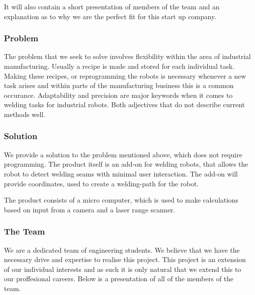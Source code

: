 It will also contain a short presentation of members of the team and an explanation as to why we are the perfect fit for this start up company.

\subsubsection{Problem}
The problem that we seek to solve involves flexibility within the area of industrial manufacturing. Usually a recipe is made and stored for each individual task.
Making these recipes, or reprogramming the robots is necessary whenever a new task arises and within parts of the manufacturing business this is a common occurance. 
Adaptability and precision are major keywords when it comes to welding tasks for industrial robots. Both adjectives that do not describe current methods well.

\subsubsection{Solution}
We provide a solution to the problem mentioned above, which does not require programming. The product itself is an add-on for welding robots, that allows the robot to detect welding seams with minimal user interaction. The add-on will provide coordinates, used to create a welding-path for the robot. 

The product consists of a micro computer, which is used to make calculations based on input from a camera and a laser range scanner. 

\subsubsection{The Team}
We are a dedicated team of engineering students. We believe that we have the necessary drive and expertise to realise this project. This project is an extension of our individual interests and as such it is only natural that we extend this to our proffesional careers. Below is a presentation of all of the members of the team.


